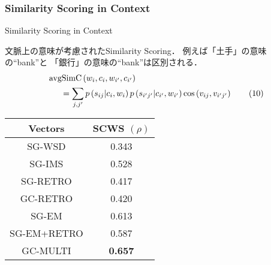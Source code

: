 \documentclass[10pt,hyperref={unicode}]{beamer}
\DeclareMathOperator*{\avgSimC}{avgSimC}
\newenvironment{wideenumerate}{\enumerate\addtolength{\itemsep}{1em}}{\endenumerate}
\newcommand{\parentheses}[1]{\left(#1\right)}
\begin{document}
\begin{frame}
\frametitle{Similarity Scoring in Context}
\begin{wideenumerate}
\setcounter{enumi}{2}
    \item Similarity Scoring in Context

        文脈上の意味が考慮されたSimilarity Scoring．
        例えば「土手」の意味の“bank”と
        「銀行」の意味の“bank”は区別される．
        \begin{align}
        &\avgSimC\parentheses{w_i,c_i,w_{i'},c_{i'}} \notag \\
        &\phantom{==}= \sum_{j,j'} p\parentheses{s_{ij}|c_i,w_i} p\parentheses{s_{i'j'}|c_{i'},w_{i'}}\cos\parentheses{v_{ij},v_{i'j'}}
        \tag{10}
        \end{align}

        \begin{center}
            \begin{algfont}
                {\renewcommand{\arraystretch}{1.5}
                    {\scriptsize
                        \begin{tabular}{|c|c|}
                            \hline
                            Vectors     & SCWS $(\rho)$ \\
                            \hline
                            SG-WSD      & 0.343      \\
                            SG-IMS      & 0.528      \\
                            SG-RETRO    & 0.417      \\
                            GC-RETRO    & 0.420      \\
                            SG-EM       & 0.613      \\
                            SG-EM+RETRO & 0.587      \\
                            GC-MULTI    & \textbf{0.657} \\
                            \hline
                        \end{tabular}
                    }
                }
            \end{algfont}
        \end{center}
\end{wideenumerate}
\end{frame}
\end{document}
